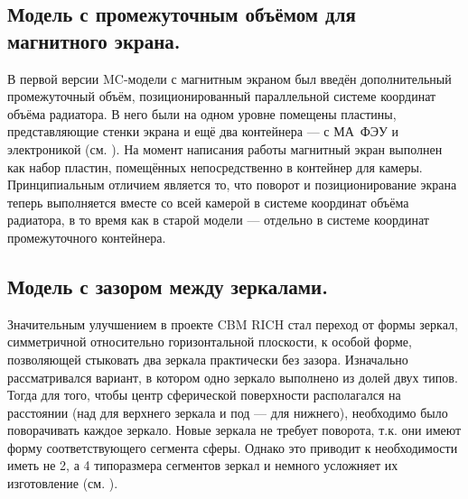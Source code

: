 \subsection{Модель с промежуточным объёмом для магнитного экрана.}

В первой версии MC-модели с магнитным экраном был введён дополнительный промежуточный объём, позиционированный параллельной системе координат объёма радиатора. В него были на одном уровне помещены пластины, представляющие стенки экрана и ещё два контейнера --- с МА~ФЭУ и электроникой (см. ). На момент написания работы магнитный экран выполнен как набор пластин, помещённых непосредственно в контейнер для камеры. Принципиальным отличием является то, что поворот и позиционирование экрана теперь выполняется вместе со всей камерой в системе координат объёма радиатора, в то время как в старой модели --- отдельно в системе координат промежуточного контейнера.

\subsection{Модель с зазором между зеркалами.}\label{sec:MirrorsEvolution}

Значительным улучшением в проекте CBM RICH стал переход от формы зеркал, симметричной относительно горизонтальной плоскости, к особой форме, позволяющей стыковать два зеркала практически без зазора. Изначально рассматривался вариант, в котором одно зеркало выполнено из долей двух типов. Тогда для того, чтобы центр сферической поверхности располагался на расстоянии (над для верхнего зеркала и под --- для нижнего), необходимо было поворачивать каждое зеркало. Новые зеркала не требует поворота, т.к. они имеют форму соответствующего сегмента сферы. Однако это приводит к необходимости иметь не 2, а 4 типоразмера сегментов зеркал и немного усложняет их изготовление (см. ).

